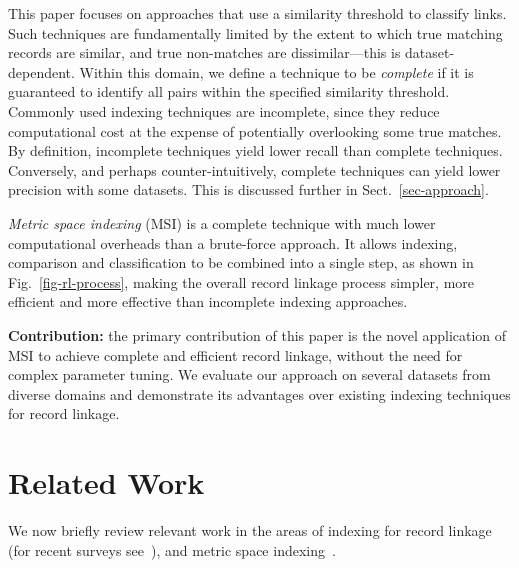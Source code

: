 \documentclass{llncs}
\begin{document}
This paper focuses on approaches that use a similarity threshold to
classify links. Such techniques are fundamentally limited by the extent
to which true matching records are similar, and true non-matches are
dissimilar---this is dataset-dependent. Within this domain, we define
a technique to be \emph{complete} if it is guaranteed to identify all
pairs within the specified similarity threshold. Commonly used indexing
techniques are incomplete, since they reduce computational cost at the
expense of potentially overlooking some true matches. By definition,
incomplete techniques yield lower recall than complete techniques.
Conversely, and perhaps counter-intuitively, complete techniques can
yield lower precision with some datasets. This is discussed further in
Sect.~\ref{sec-approach}.

\emph{Metric space indexing} (MSI) is a complete technique with much
lower computational overheads than a brute-force approach. It allows
indexing, comparison and classification to be combined into a single
step, as shown in Fig.~\ref{fig-rl-process}, making the overall record
linkage process simpler, more efficient and more effective than
incomplete indexing approaches.

\textbf{Contribution:} the primary contribution of this paper is the
novel application of MSI to achieve complete and efficient record
linkage, without the need for complex parameter tuning. We evaluate our
approach on several datasets from diverse domains and demonstrate its
advantages over existing indexing techniques for record linkage.



\section{Related Work}
\label{sec-related}

We now briefly review relevant work in the areas of indexing for record
linkage (for recent surveys see~\cite{Chr12b,Pap16}), and metric space
indexing~\cite{Zezula2010}.
\end{document}

